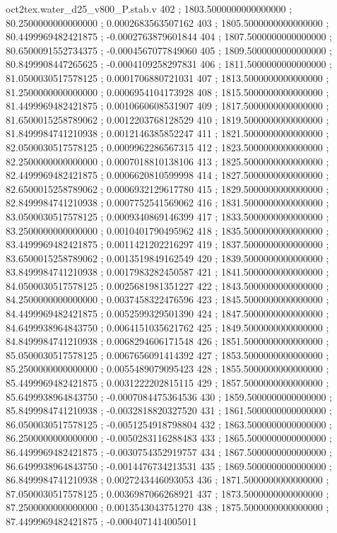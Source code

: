 \begin{filecontents}[overwrite]{oct2tex.water_d25_v800_P.stab.v}
402 ; 1803.5000000000000000 ; 80.2500000000000000 ; 0.0002683563507162
403 ; 1805.5000000000000000 ; 80.4499969482421875 ; -0.0002763879601844
404 ; 1807.5000000000000000 ; 80.6500091552734375 ; -0.0004567077849060
405 ; 1809.5000000000000000 ; 80.8499908447265625 ; -0.0004109258297831
406 ; 1811.5000000000000000 ; 81.0500030517578125 ; 0.0001706880721031
407 ; 1813.5000000000000000 ; 81.2500000000000000 ; 0.0006954104173928
408 ; 1815.5000000000000000 ; 81.4499969482421875 ; 0.0010660608531907
409 ; 1817.5000000000000000 ; 81.6500015258789062 ; 0.0012203768128529
410 ; 1819.5000000000000000 ; 81.8499984741210938 ; 0.0012146385852247
411 ; 1821.5000000000000000 ; 82.0500030517578125 ; 0.0009962286567315
412 ; 1823.5000000000000000 ; 82.2500000000000000 ; 0.0007018810138106
413 ; 1825.5000000000000000 ; 82.4499969482421875 ; 0.0006620810599998
414 ; 1827.5000000000000000 ; 82.6500015258789062 ; 0.0006932129617780
415 ; 1829.5000000000000000 ; 82.8499984741210938 ; 0.0007752541569062
416 ; 1831.5000000000000000 ; 83.0500030517578125 ; 0.0009340869146399
417 ; 1833.5000000000000000 ; 83.2500000000000000 ; 0.0010401790495962
418 ; 1835.5000000000000000 ; 83.4499969482421875 ; 0.0011421202216297
419 ; 1837.5000000000000000 ; 83.6500015258789062 ; 0.0013519849162549
420 ; 1839.5000000000000000 ; 83.8499984741210938 ; 0.0017983282450587
421 ; 1841.5000000000000000 ; 84.0500030517578125 ; 0.0025681981351227
422 ; 1843.5000000000000000 ; 84.2500000000000000 ; 0.0037458322476596
423 ; 1845.5000000000000000 ; 84.4499969482421875 ; 0.0052599329501390
424 ; 1847.5000000000000000 ; 84.6499938964843750 ; 0.0064151035621762
425 ; 1849.5000000000000000 ; 84.8499984741210938 ; 0.0068294606171548
426 ; 1851.5000000000000000 ; 85.0500030517578125 ; 0.0067656091414392
427 ; 1853.5000000000000000 ; 85.2500000000000000 ; 0.0055489079095423
428 ; 1855.5000000000000000 ; 85.4499969482421875 ; 0.0031222202815115
429 ; 1857.5000000000000000 ; 85.6499938964843750 ; -0.0007084475364536
430 ; 1859.5000000000000000 ; 85.8499984741210938 ; -0.0032818820327520
431 ; 1861.5000000000000000 ; 86.0500030517578125 ; -0.0051254918798804
432 ; 1863.5000000000000000 ; 86.2500000000000000 ; -0.0050283116288483
433 ; 1865.5000000000000000 ; 86.4499969482421875 ; -0.0030754352919757
434 ; 1867.5000000000000000 ; 86.6499938964843750 ; -0.0014476734213531
435 ; 1869.5000000000000000 ; 86.8499984741210938 ; 0.0027243446093053
436 ; 1871.5000000000000000 ; 87.0500030517578125 ; 0.0036987066268921
437 ; 1873.5000000000000000 ; 87.2500000000000000 ; 0.0013543043751270
438 ; 1875.5000000000000000 ; 87.4499969482421875 ; -0.0004071414005011

\end{filecontents}
